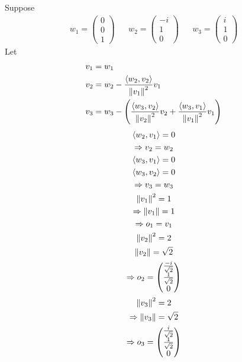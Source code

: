 \begin{enumerate}
Suppose
\begin{align}
w_1 = \begin{pmatrix}0\\0\\1\end{pmatrix} & & w_2
= \begin{pmatrix}-i\\1\\0\end{pmatrix} & & w_3 = \begin{pmatrix} i\\1\\0\end{pmatrix}
\end{align}
Let
\begin{align}
v_1 &= w_1\\
v_2 &= w_2 - \frac{\langle w_2,v_2\rangle}{\left\lVert v_1\right\rVert^2}v_1\\
v_3 &= w_3 - \left(\frac{\langle w_3,v_2\rangle}{\left\lVert v_2\right\rVert^2}v_2 +
  \frac{\langle w_3,v_1\rangle}{\left\lVert v_1\right\rVert^2}v_1\right)\\
\end{align}
\begin{gather}
\langle w_2,v_1 \rangle = 0\\
\Rightarrow v_2 = w_2 \\
\langle w_3,v_1 \rangle = 0\\
\langle w_3,v_2 \rangle = 0\\
\Rightarrow v_3 = w_3\\
\left\lVert v_1\right\rVert^2 = 1\\
\Rightarrow \left\lVert v_1\right\rVert =1\\
\Rightarrow o_1 = v_1\\
\left\lVert v_2\right\rVert^2 = 2\\
\left\lVert v_2\right\rVert = \sqrt{2}\\
\Rightarrow o_2 = \begin{pmatrix}
  \frac{-i}{\sqrt{2}}\\\frac{1}{\sqrt{2}}\\0\end{pmatrix}\\
\left\lVert v_3\right\rVert^2 = 2\\
\Rightarrow \left\lVert v_3\right\rVert = \sqrt{2}\\
\Rightarrow o_3 = \begin{pmatrix}\frac{i}{\sqrt{2}}\\\frac{1}{\sqrt{2}}\\0\end{pmatrix}
\end{gather}
\begin{gather}

\end{gather}
\end{enumerate}
